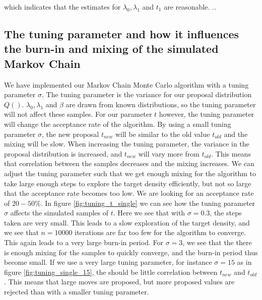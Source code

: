 which indicates that the estimates for $\lambda_0, \lambda_1$ and $t_1$ are reasonable. ..



\subsection{The tuning parameter and how it influences the burn-in and mixing of the simulated Markov Chain}

We have implemented our Markov Chain Monte Carlo algorithm with a tuning parameter $\sigma$. The tuning parameter is the variance for our proposal distribution $Q()$. $\lambda_0, \lambda_1$ and $\beta$ are drawn from known distributions, so the tuning parameter will not affect these samples. For our parameter $t$ however, the tuning parameter will change the acceptance rate of the algorithm. By using a small tuning parameter $\sigma$, the new proposal $t_{new}$ will be similar to the old value $t_{old}$ and the mixing will be slow. When increasing the tuning parameter, the variance in the proposal distribution is increased, and $t_{new}$ will vary more from $t_{old}$. This means that correlation between the samples decreases and the mixing increases. We can adjust the tuning parameter such that we get enough mixing for the algorithm to take large enough steps to explore the target density efficiently, but not so large that the acceptance rate becomes too low. We are looking for an acceptance rate of $20 - 50\%$. In figure \ref{fig:tuning_t_single} we can see how the tuning parameter $\sigma$ affects the simulated samples of $t$.  Here we see that with $\sigma = 0.3$, the steps taken are very small. This leads to a slow exploration of the target density, and we see that $n = 10000$ iterations are far too few for the algorithm to converge. This again leads to a very large burn-in period. For $\sigma = 3$, we see that the there is enough mixing for the samples to quickly converge, and the burn-in period thus become small. If we use a very large tuning parameter, for instance $\sigma = 15$ as in figure \ref{fig:tuning_single_15}, the should be little correlation between $t_{new}$ and $t_{old}$. This means that large moves are proposed, but more proposed values are rejected than with a smaller tuning parameter. 


